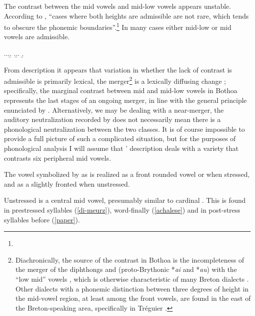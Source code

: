 The contrast between the mid vowels \ipa{[ɛ~ɔ]} and mid-low vowels \ipa{[æ~ɒ]} appears unstable. According to \citet[p.~97]{humphreys95:_phonol_bothoa_saint_nicol_pelem}, \enquote{cases where both heights are admissible are not rare, which tends to obscure the   phonemic boundaries}.\footnote{} In many cases either mid-low or mid vowels are admissible.

\ex.\a.\a.\b.\mbi{[ˈfræːr]}
\z.\b.\a.
\b.

From  description it appears that variation in whether the lack of contrast is admissible is primarily lexical, \ie the merger\footnote{Diachronically, the source of the contrast in Bothoa is the incompleteness of the merger of the diphthongs \ipa{[aɛ̯]} and \ipa{[aɔ̯]} (proto-Brythonic *\emph{ai} and *\emph{au}) with the \enquote{low mid} vowels \ipa{[ɛ~ɔ]}, which is otherwise characteristic of many Breton dialects \citep[\S\S253, 353]{histbreton}. Other dialects with a phonemic distinction between three degrees of height in the mid-vowel region, at least among the front vowels, are found in the east of the Breton-speaking area, specifically in Tréguier \citep{botsorhel,le78:_le_ploug}.} is a lexically diffusing change \citep{labov81:_resol_neogr_contr}; specifically, the marginal contrast between mid and mid-low vowels in Bothoa represents the last stages of an ongoing merger, in line with the general principle enunciated by \citet[ch.~12]{labov94:_princ}. Alternatively, we may be dealing with a near-merger, \ie the auditory neutralization recorded by \citet{humphreys95:_phonol_bothoa_saint_nicol_pelem} does not necessarily mean there is a phonological neutralization between the two classes. It is of course impossible to provide a full picture of such a complicated situation, but for the purposes of phonological analysis I will assume that \citeauthor{humphreys95:_phonol_bothoa_saint_nicol_pelem}' description deals with a variety that contrasts six peripheral mid vowels.

The vowel symbolized by \citet{humphreys95:_phonol_bothoa_saint_nicol_pelem} as \ipa{[ə]} is realized as a front rounded vowel  or  when stressed, and as a slightly fronted \ipa{[ə]} when unstressed.

Unstressed \ipa{[ə]} is a central mid vowel, presumably similar to cardinal \ipa{[ə]}. This  is found in prestressed syllables (\cref{di-meurz}), word-finally (\cref{achalese}) and in post-stress syllables before \ipa{[r]} (\cref{paper}).


